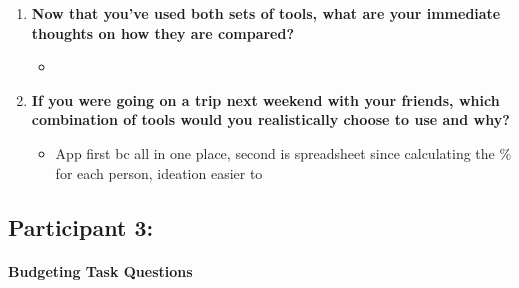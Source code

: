 \documentclass[12pt,a4paper]{article}
\begin{document}
\begin{enumerate}
    \item \textbf{Now that you've used both sets of tools, what are your immediate thoughts on how they are compared?}
    
    \begin{itemize}
        \item [N/A]
    \end{itemize}
    
    \item \textbf{If you were going on a trip next weekend with your friends, which combination of tools would you realistically choose to use and why?}
    
    \begin{itemize}
        \item App first bc all in one place, second is spreadsheet since calculating the \% for each person, ideation easier to
    \end{itemize}
\end{enumerate}

\subsection{Participant 3:}
\paragraph{Budgeting Task Questions}
\end{document}
